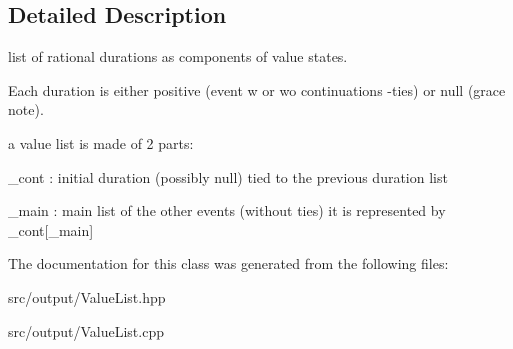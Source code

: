 \subsection{Detailed Description}
list of rational durations as components of value states. 

Each duration is either positive (event w or wo continuations -\/ties) or null (grace note).

a value list is made of 2 parts\+:
\begin{DoxyItemize}
\item \+\_\+cont \+: initial duration (possibly null) tied to the previous duration list
\item \+\_\+main \+: main list of the other events (without ties) it is represented by \+\_\+cont\mbox{[}\+\_\+main\mbox{]} 
\end{DoxyItemize}

The documentation for this class was generated from the following files\+:\begin{DoxyCompactItemize}
\item 
src/output/Value\+List.\+hpp\item 
src/output/Value\+List.\+cpp\end{DoxyCompactItemize}
